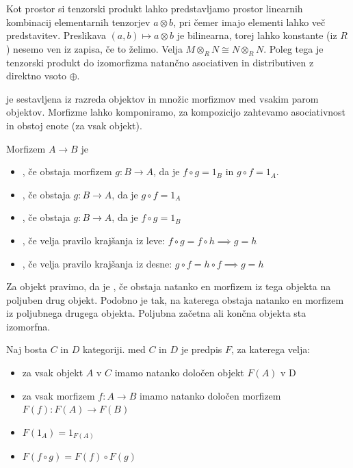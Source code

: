 Kot prostor si tenzorski produkt lahko predstavljamo prostor linearnih
kombinacij elementarnih tenzorjev $a \otimes b$, pri čemer imajo elementi lahko
več predstavitev.
Preslikava $(a,b) \mapsto a \otimes b$ je bilinearna, torej lahko konstante (iz
$R$) nesemo ven iz zapisa, če to želimo.
Velja $M \otimes_R N \cong N \otimes_R N$.
Poleg tega je tenzorski produkt do izomorfizma natančno asociativen in
distributiven z direktno vsoto $\oplus$.


 je sestavljena iz razreda objektov in množic morfizmov med
vsakim parom objektov.
Morfizme lahko komponiramo, za kompozicijo zahtevamo asociativnost in obstoj
enote (za vsak objekt).

Morfizem $A \to B$ je
\begin{itemize}
\item {}, če obstaja morfizem $g: B \to A$, da je $f \circ g =
  1_B$ in $g \circ f = 1_A$.
\item {}, če obstaja $g: B \to A$, da je $g \circ f = 1_A$
\item {}, če obstaja $g: B \to A$, da je $f \circ g = 1_B$
\item {}, če velja pravilo krajšanja iz leve: $f \circ g = f
  \circ h \implies g = h$
\item {}, če velja pravilo krajšanja iz desne: $g \circ f = h
  \circ f \implies g = h$
\end{itemize}

Za objekt pravimo, da je , če obstaja natanko en morfizem iz tega
objekta na poljuben drug objekt.
Podobno je  tak, na katerega obstaja natanko en morfizem iz
poljubnega drugega objekta.
Poljubna začetna ali končna objekta sta izomorfna.

\begin{definicija}
  Naj bosta $C$ in $D$ kategoriji.
   med $C$ in $D$ je predpis $F$, za katerega velja:
  \begin{itemize}
  \item za vsak objekt $A$ v $C$ imamo natanko določen objekt $F(A)$ v D
  \item za vsak morfizem $f: A \to B$ imamo natanko določen morfizem $F(f): F(A)
	\to F(B)$
  \item $F(1_A) = 1_{F(A)}$
  \item $F(f \circ g) = F(f) \circ F(g)$
  \end{itemize}
\end{definicija}

